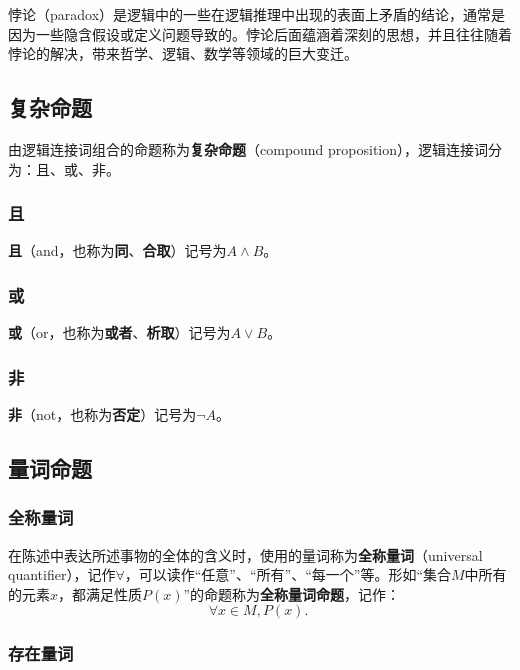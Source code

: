 悖论（paradox）是逻辑中的一些在逻辑推理中出现的表面上矛盾的结论，通常是因为一些隐含假设或定义问题导致的。悖论后面蕴涵着深刻的思想，并且往往随着悖论的解决，带来哲学、逻辑、数学等领域的巨大变迁。

\subsection{复杂命题}\label{sub_HsLogi_1}

由逻辑连接词组合的命题称为\textbf{复杂命题}（compound proposition），逻辑连接词分为：且、或、非。

\subsubsection{且}

\textbf{且}（and，也称为\textbf{同}、\textbf{合取}）记号为$A\land B$。

\subsubsection{或}

\textbf{或}（or，也称为\textbf{或者}、\textbf{析取}）记号为$A\lor B$。


\subsubsection{非}
\textbf{非}（not，也称为\textbf{否定}）记号为$\lnot A$。

\subsection{量词命题}

\subsubsection{全称量词}

在陈述中表达所述事物的全体的含义时，使用的量词称为\textbf{全称量词}（universal quantifier），记作$\forall$，可以读作“任意”、“所有”、“每一个”等。形如“集合$M$中所有的元素$x$，都满足性质$P(x)$”的命题称为\textbf{全称量词命题}，记作：
\begin{equation}
\forall x\in M,P(x).~
\end{equation}


\subsubsection{存在量词}

